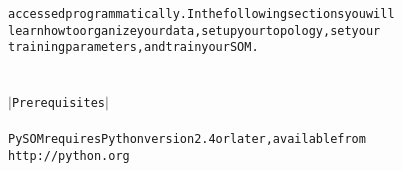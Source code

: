 {{\begin{tabbing}
{\texttt{accessed\hspace{6pt}programmatically.\hspace{12pt}In\hspace{6pt}the\hspace{6pt}following\hspace{6pt}sections\hspace{6pt}you\hspace{6pt}will}}\\
{\texttt{learn\hspace{6pt}how\hspace{6pt}to\hspace{6pt}organize\hspace{6pt}your\hspace{6pt}data,\hspace{6pt}set\hspace{6pt}up\hspace{6pt}your\hspace{6pt}topology,\hspace{6pt}set\hspace{6pt}your}}\\
{\texttt{training\hspace{6pt}parameters,\hspace{6pt}and\hspace{6pt}train\hspace{6pt}your\hspace{6pt}SOM.}}\\
\\
{\texttt{\dash{}\dash{}\dash{}\dash{}\dash{}\dash{}\dash{}\dash{}\dash{}\dash{}\dash{}\dash{}\dash{}\dash{}\dash{}\dash{}\dash{}}}\\
{\texttt{$|$\hspace{6pt}Prerequisites\hspace{6pt}$|$}}\\
{\texttt{\dash{}\dash{}\dash{}\dash{}\dash{}\dash{}\dash{}\dash{}\dash{}\dash{}\dash{}\dash{}\dash{}\dash{}\dash{}\dash{}\dash{}}}\\
{\texttt{PySOM\hspace{6pt}requires\hspace{6pt}Python\hspace{6pt}version\hspace{6pt}2.4\hspace{6pt}or\hspace{6pt}later,\hspace{6pt}available\hspace{6pt}from}}\\
{\texttt{http://python.org}}\\

\end{tabbing}}}
